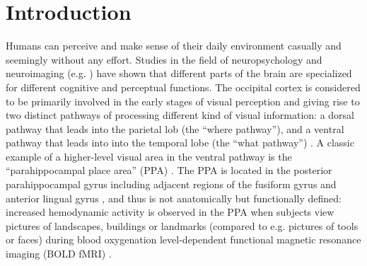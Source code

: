 \documentclass[english]{article}
\begin{document}
\section{Introduction}




Humans can perceive and make sense of their daily environment casually and
seemingly without any effort.
%
Studies in the field of neuropsychology and neuroimaging (e.g.
\citep{penfield1950cerebral, fox1984noninvasive}) have shown that different
parts of the brain are specialized for different cognitive and perceptual
functions.
The occipital cortex is considered to be primarily involved in the early stages
of visual perception and giving rise to two distinct pathways of processing
different kind of visual information:
a dorsal pathway that leads into the parietal lob (the ``where pathway''), and a
ventral pathway that leads into into the temporal lobe (the ``what pathway'')
\citep{goodale1992separat, mishkin1982contribution}.
A classic example of a higher-level visual area in the ventral pathway is the
``parahippocampal place area'' (PPA) \citep{epstein1998ppa,
epstein1999parahippocampal}.
The PPA is located in the posterior parahippocampal gyrus including adjacent
regions of the fusiform gyrus and anterior lingual gyrus
\citep{epstein2008parahippocampal}, and thus is not anatomically but
functionally defined:
increased hemodynamic activity is observed in the PPA when subjects view
pictures of landscapes, buildings or landmarks (compared to e.g. pictures of
tools or faces) during blood oxygenation level-dependent functional magnetic
resonance imaging (BOLD fMRI) \citep{aguirre1998area, epstein2014neural,
epstein1998ppa, troiani2012object}.
\end{document}
